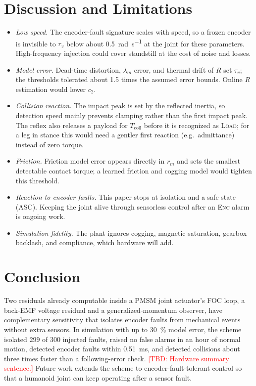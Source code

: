 \documentclass[conference]{IEEEtran}
\newcommand{\TBD}[1]{\textcolor{red}{[TBD: #1]}}
\begin{document}
\section{Discussion and Limitations}
\label{sec:discussion}
\begin{itemize}
  \item \emph{Low speed.} The encoder-fault signature scales with speed, so a
  frozen encoder is invisible to $r_v$ below about
  \SI{0.5}{\radian\per\second} at the joint for these parameters. High-frequency
  injection could cover standstill at the cost of noise and losses.
  \item \emph{Model error.} Dead-time distortion, $\lambda_m$ error, and
  thermal drift of $R$ set $\tau_v$; the thresholds tolerated about 1.5 times
  the assumed error bounds. Online $R$ estimation would lower $c_2$.
  \item \emph{Collision reaction.} The impact peak is set by the reflected
  inertia, so detection speed mainly prevents clamping rather than the first
  impact peak. The reflex also releases a payload for
  $T_\mathrm{coll}$ before it is recognized as \textsc{Load}; for a leg in
  stance this would need a gentler first reaction (e.g.\ admittance) instead of
  zero torque.
  \item \emph{Friction.} Friction model error appears directly in $r_m$ and
  sets the smallest detectable contact torque; a learned friction and cogging
  model would tighten this threshold.
  \item \emph{Reaction to encoder faults.} This paper stops at isolation and
  a safe state (ASC). Keeping the joint alive through sensorless control after
  an \textsc{Enc} alarm is ongoing work.
  \item \emph{Simulation fidelity.} The plant ignores cogging, magnetic
  saturation, gearbox backlash, and compliance, which hardware will add.
\end{itemize}

\section{Conclusion}
\label{sec:conclusion}
Two residuals already computable inside a PMSM joint actuator's FOC loop, a
back-EMF voltage residual and a generalized-momentum observer, have
complementary sensitivity that isolates encoder faults from mechanical events
without extra sensors. In simulation with up to \SI{30}{\percent} model error,
the scheme isolated 299 of 300 injected faults, raised no false alarms in an
hour of normal motion, detected encoder faults within \SI{0.51}{\milli\second},
and detected collisions about three times faster than a following-error check.
\TBD{Hardware summary sentence.} Future work extends the scheme to
encoder-fault-tolerant control so that a humanoid joint can keep operating
after a sensor fault.



\end{document}

